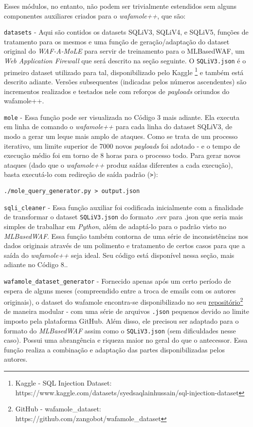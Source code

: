 Esses módulos, no entanto, não podem ser trivialmente estendidos sem alguns componentes auxiliares criados para o \textit{wafamole++}, que são:
\begin{alineas}
\item \verb+datasets+ - Aqui são contidos os datasets SQLiV3, SQLiV4, e SQLiV5, funções de tratamento para os mesmos e uma função de geração/adaptação do dataset original do \textit{WAF-A-MoLE} para servir de treinamento para o MLBasedWAF, um \textit{Web Application Firewall} que será descrito na seção seguinte. O \verb+SQLiV3.json+ é o primeiro dataset utilizado para tal, disponibilizado pelo Kaggle \footnote{Kaggle - SQL Injection Dataset: https://www.kaggle.com/datasets/syedsaqlainhussain/sql-injection-dataset} \cite{kaggle_dataset_sql} e também está descrito adiante. Versões subsequentes (indicadas pelos números ascendentes) são incrementos realizados e testados nele com reforços de \textit{payloads} oriundos do wafamole++.

\begin{alineas}
\item \verb+mole+ - Essa função pode ser visualizada no Código 3 mais adiante. Ela executa em linha de comando o \textit{wafamole++} para cada linha do dataset SQLiV3, de modo a gerar um leque mais amplo de ataques. Como se trata de um processo iterativo, um limite superior de 7000 novos \textit{payloads} foi adotado - e o tempo de execução médio foi em torno de 8 horas para o processo todo. Para gerar novos ataques (dado que o \textit{wafamole++} produz saídas diferentes a cada execução), basta executá-lo com redireção de saída padrão (\verb+>+):
\begin{verbatim}
./mole_query_generator.py > output.json
\end{verbatim}


\item \verb+sqli_cleaner+ - Essa função auxiliar foi codificada inicialmente com a finalidade de transformar o dataset \verb+SQLiV3.json+ do formato .csv para .json que seria mais simples de trabalhar em \textit{Python}, além de adaptá-lo para o padrão visto no \textit{MLBasedWAF}. Essa função também contorna de uma série de inconsistências nos dados originais através de um polimento e tratamento de certos casos para que a saída do \textit{wafamole++} seja ideal. Seu código está disponível nessa seção, mais adiante no Código 8..

\item \verb+wafamole_dataset_generator+ - Fornecido apenas após um certo período de espera de alguns meses (compreendido entre a troca de emails com os autores originais), o dataset do wafamole encontra-se disponibilizado no seu \href{https://github.com/zangobot/wafamole_dataset}{repositório}\footnote{GitHub - wafamole\_dataset: https://github.com/zangobot/wafamole_dataset} de maneira modular - com uma série de arquivos \verb+.json+ pequenos devido ao limite imposto pela plataforma GitHub. Além disso, ele precisou ser adaptado para o formato do \textit{MLBasedWAF} assim como o \verb+SQLiV3.json+ (sem dificuldades nesse caso). Possui uma abrangência e riqueza maior no geral do que o antecessor. Essa função realiza a combinação e adaptação das partes disponibilizadas pelos autores.


\end{alineas}
\end{alineas}
